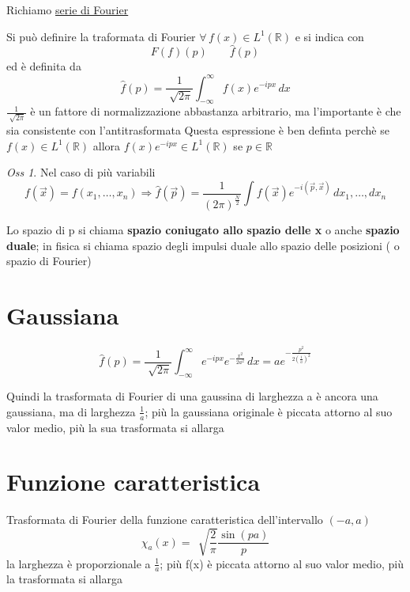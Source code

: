 \documentclass[a4paper,11pt]{report}
\theoremstyle{remark}
\newtheorem*{oss}{Oss}
\theoremstyle{definition}
\newcommand{\R}{\mathbb{R}}
\begin{document}
Richiamo \hyperref[Fourier]{serie di Fourier}

\noindent Si può definire la traformata di Fourier  $\forall \, f(x)\in L^1(\R)$ e si indica con
\begin{equation*}
	F(f)(p) \qquad \hat{f}(p)
\end{equation*}
ed è definita da
\begin{equation*}
	\hat{f}(p) = \frac{1}{\sqrt[]{2\pi}} \int_{-\infty}^\infty f(x)e^{-ipx} \, dx 
\end{equation*}
$\frac{1}{\sqrt[]{2\pi}}$ è un fattore di normalizzazione abbastanza arbitrario, ma l'importante è che sia consistente con l'antitrasformata \newline
Questa espressione è ben definta perchè se $f(x)\in L^1(\R)$ allora $f(x)e^{-ipx}\in L^1(\R)$ se $p\in\R$

\begin{oss}
	Nel caso di più variabili
	\begin{equation*}
		f(\vec{x}) = f(x_1,\dots,x_n) \Rightarrow \hat{f}(\vec{p}) = \frac{1}{{(2\pi)}^{\frac{N}{2}}}\int f(\vec{x})e^{-i(\vec{p},\vec{x})} \, dx_1,\dots,dx_n
	\end{equation*}
\end{oss}

\noindent Lo spazio di p si chiama \textbf{spazio coniugato allo spazio delle x} o anche \textbf{spazio duale}; in fisica si chiama spazio degli impulsi duale allo spazio delle posizioni ( o spazio di Fourier)

\section{Gaussiana}

\begin{equation*}
	\hat{f}(p) = \frac{1}{\sqrt[]{2\pi}} \int_{-\infty}^\infty e^{-ipx}e^{-\frac{x^2}{2a^2}}\, dx = ae^{-\frac{p^2}{2{\left(\frac{1}{a}\right)}^2}}
\end{equation*}

\noindent Quindi la trasformata di Fourier di una gaussina di larghezza a è ancora una gaussiana, ma di larghezza $\frac{1}{a}$; più la gaussiana originale è piccata attorno al suo valor medio, più la sua trasformata si allarga

\section{Funzione caratteristica}

Trasformata di Fourier della funzione caratteristica dell'intervallo $(-a,a)$
\begin{equation*}
	\hat{\chi}_a(x) = \,  \sqrt[]{\frac{2}{\pi}} \frac{\sin{(pa)}}{p}
\end{equation*}
la larghezza è proporzionale a $\frac{1}{a}$; più f(x) è piccata attorno al suo valor medio, più la trasformata si allarga
\end{document}
